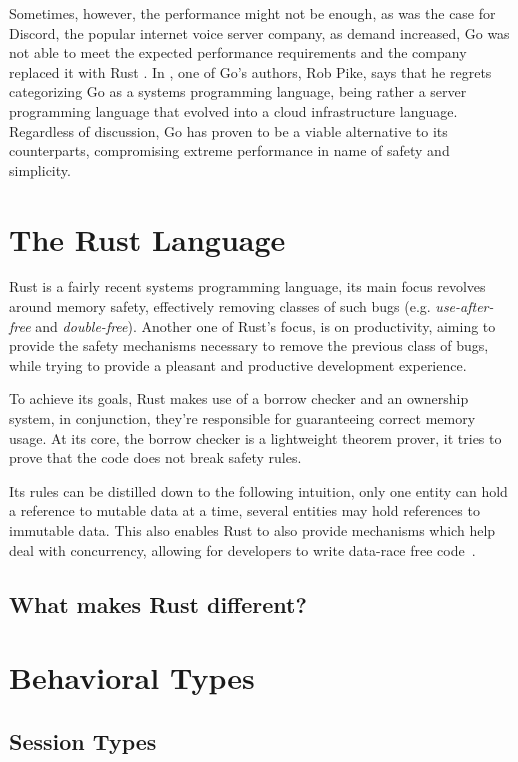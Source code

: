 Sometimes, however, the performance might not be enough,
as was the case for Discord, the popular internet voice server company, as demand increased,
Go was not able to meet the expected performance requirements and the company replaced it with Rust \autocite{Howarth2020}.
In \autocite{Torre2014}, one of Go's authors, Rob Pike, says that he regrets categorizing Go as a systems programming language,
being rather a server programming language that evolved into a cloud infrastructure language.
Regardless of discussion, Go has proven to be a viable alternative to its counterparts,
compromising extreme performance in name of safety and simplicity.

\section{The Rust Language}\label{sec:rust-lang}

Rust is a fairly recent systems programming language,
its main focus revolves around memory safety,
effectively removing classes of such bugs (e.g. \emph{use-after-free} and \emph{double-free}).
Another one of Rust's focus, is on productivity,
aiming to provide the safety mechanisms necessary to remove the previous class of bugs,
while trying to provide a pleasant and productive development experience.

To achieve its goals, Rust makes use of a borrow checker and an ownership system,
in conjunction, they're responsible for guaranteeing correct memory usage.
At its core, the borrow checker is a lightweight theorem prover,
it tries to prove that the code does not break safety rules.

Its rules can be distilled down to the following intuition,
only one entity can hold a reference to mutable data at a time,
several entities may hold references to immutable data.
This also enables Rust to also provide mechanisms which help deal with concurrency,
allowing for developers to write data-race free
code~\autocite{Turon2015}.

\subsection{What makes Rust different?}

\section{Behavioral Types}\label{sec:behavioral-types}

\subsection{Session Types}


